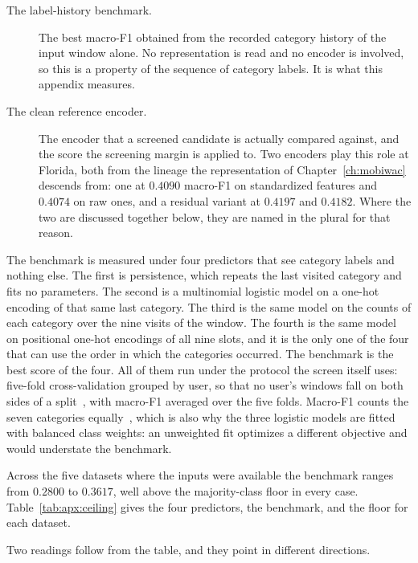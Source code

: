 \begin{description}
  \item[The label-history benchmark.] The best macro-F1 obtained from the recorded category
        history of the input window alone. No representation is read and no encoder is involved,
        so this is a property of the sequence of category labels. It is what this appendix
        measures.
  \item[The clean reference encoder.] The encoder that a screened candidate is actually compared
        against, and the score the screening margin is applied to. Two encoders play this role at
        Florida, both from the lineage the representation of Chapter~\ref{ch:mobiwac} descends
        from: one at $0.4090$ macro-F1 on standardized features and $0.4074$ on raw ones, and a
        residual variant at $0.4197$ and $0.4182$. Where the two are discussed together below,
        they are named in the plural for that reason.
\end{description}

The benchmark is measured under four predictors that see category labels and nothing else. The
first is persistence, which repeats the last visited category and fits no parameters. The second is
a multinomial logistic model on a one-hot encoding of that same last category. The third is the
same model on the counts of each category over the nine visits of the window. The fourth is the
same model on positional one-hot encodings of all nine slots, and it is the only one of the four
that can use the order in which the categories occurred. The benchmark is the best score of the
four. All of them run under the protocol the screen itself uses: five-fold cross-validation grouped
by user, so that no user's windows fall on both sides of a
split~\cite{kohavi1995crossval,pedregosa2011sklearn}, with macro-F1 averaged over the five folds.
Macro-F1 counts the seven categories equally~\cite{sokolova2009measures}, which is also why the
three logistic models are fitted with balanced class weights: an unweighted fit optimizes a
different objective and would understate the benchmark.

Across the five datasets where the inputs were available the benchmark ranges from $0.2800$ to
$0.3617$, well above the majority-class floor in every case.
Table~\ref{tab:apx:ceiling} gives the four predictors, the benchmark, and the floor for each
dataset.



Two readings follow from the table, and they point in different directions.

